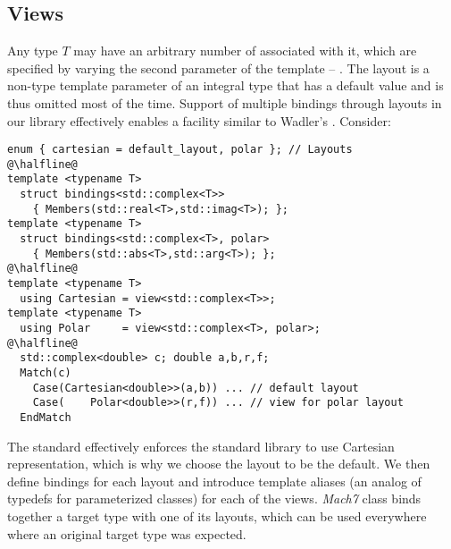 
\subsection{Views}
\label{sec:view}

Any type $T$ may have an arbitrary number of  associated with it, 
which are specified by varying the second parameter of the  
template -- . The layout is a non-type template parameter of an 
integral type that has a default value and is thus omitted most of the time.
Support of multiple bindings through layouts in our library effectively enables 
a facility similar to Wadler's \cite{Wadler87}. Consider:

\begin{lstlisting}
enum { cartesian = default_layout, polar }; // Layouts
@\halfline@
template <typename T> 
  struct bindings<std::complex<T>>
    { Members(std::real<T>,std::imag<T>); };
template <typename T> 
  struct bindings<std::complex<T>, polar>
    { Members(std::abs<T>,std::arg<T>); };
@\halfline@
template <typename T> 
  using Cartesian = view<std::complex<T>>;
template <typename T> 
  using Polar     = view<std::complex<T>, polar>;
@\halfline@
  std::complex<double> c; double a,b,r,f;
  Match(c)
    Case(Cartesian<double>>(a,b)) ... // default layout
    Case(    Polar<double>>(r,f)) ... // view for polar layout
  EndMatch
\end{lstlisting}

\noindent
The \Cpp{} standard effectively enforces the standard library to use Cartesian 
representation\cite[-4]{C++11}, which is why we choose the 
 layout to be the default. We then define bindings for each 
layout and introduce template aliases (an analog of typedefs for parameterized 
classes) for each of the views. \emph{Mach7} class  binds together a 
target type with one of its layouts, which can be used everywhere where an 
original target type was expected.

